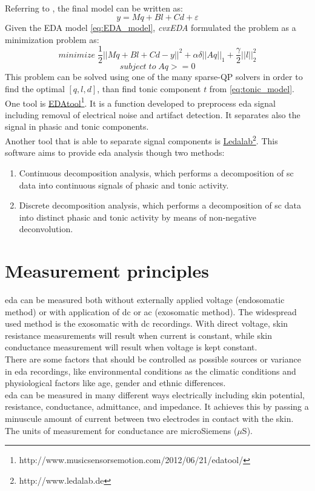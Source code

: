 \\
Referring to \cite{greco2016arousal}, the final model can be written as:
\begin{equation}
	\label{eq:EDA_model}
	y=Mq+Bl+Cd+\varepsilon 
\end{equation}
Given the EDA model \ref{eq:EDA_model}, \textit{cvxEDA} formulated the problem as a minimization problem as:
\begin{equation}
	minimize \; \dfrac{1}{2} ||Mq+Bl+Cd-y||^2+\alpha \delta ||Aq||_1+\dfrac{\gamma}{2}||l||^2_2
\end{equation}
\[subject \; to \; Aq>=0 \]
This problem can be solved using one of the many sparse-QP solvers in order to find the optimal $[q,l,d]$, than find tonic component $t$ from \ref{eq:tonic_model}.
\\ \indent
One tool is \href{http://www.musicsensorsemotion.com/2012/06/21/edatool/}{EDAtool}\footnote{http://www.musicsensorsemotion.com/2012/06/21/edatool/}. It is a function developed to preprocess \gls{eda} signal including removal of electrical noise and artifact detection. It separates also the signal in phasic and tonic components.
\\ \indent
Another tool that is able to separate signal components is \href{http://www.ledalab.de}{Ledalab}\footnote{http://www.ledalab.de}. This software aims to provide \gls{eda} analysis though two methods:
\begin{enumerate}
	\item  Continuous decomposition analysis, which performs a decomposition of \gls{sc} data into continuous signals of phasic and tonic activity.
	\item Discrete decomposition analysis, which performs a decomposition of \gls{sc} data into distinct phasic and tonic activity by means of non-negative deconvolution.
\end{enumerate}

\section{Measurement principles}
\gls{eda} can be measured both without externally applied voltage (endosomatic method) or with application of \gls{dc} or \gls{ac} (exosomatic method). The widespread used method is the exosomatic with \gls{dc} recordings. With direct voltage, skin resistance measurements will result when current is constant, while skin conductance measurement will result when voltage is kept constant.
\\ \indent
There are some factors that should be controlled as possible sources or variance in \gls{eda} recordings, like environmental conditions as the climatic conditions and physiological factors like age, gender and ethnic differences.
\\ \indent
\gls{eda} can be measured in many different ways electrically including skin potential, resistance, conductance, admittance, and impedance. It achieves this by passing a minuscule amount of current between two electrodes in contact with the skin. The units of measurement for conductance are microSiemens ($\mu$S).

